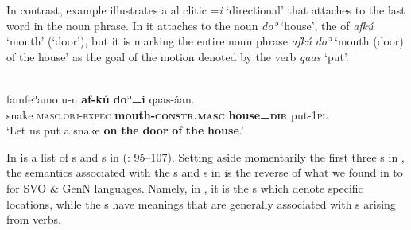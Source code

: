 \documentclass[output=paper]{langsci/langscibook}
\begin{document}
\noindent In contrast, example  illustrates a al clitic =\textit{i} ‘directional’ that attaches to the last word in the noun phrase. In  it attaches to the noun \textit{doʾ} ‘house’, the  of \textit{afkú} ‘mouth’ (‘door’), but it is marking the entire noun phrase \textit{afkú} \textit{doʾ} ‘mouth (door) of the house’ as the goal of the motion  denoted by the verb \textit{qaas} ‘put’.

\ea\label{ex:dryer:31}
\\
\gll famfeʾamo  u-n  \textbf{af-kú}  \textbf{doʾ=i}  qaas-áan.\\
       snake  \textsc{masc.obj-expec}  \textbf{mouth-\textsc{constr.masc}}  \textbf{house=\textsc{dir}}  put-\textsc{1pl}  \\
\glt ‘Let us put a snake \textbf{on} \textbf{the} \textbf{door} \textbf{of} \textbf{the} \textbf{house}.’
\z

In  is a list of s and s in  (\citealt{Mous1993}: 95–107). Setting aside momentarily the first three s in , the semantics associated with the s and s in  is the reverse of what we found in  to  for SVO \& GenN languages. Namely, in , it is the s which denote specific locations, while the s have meanings that are generally associated with s arising from verbs.
\end{document}
